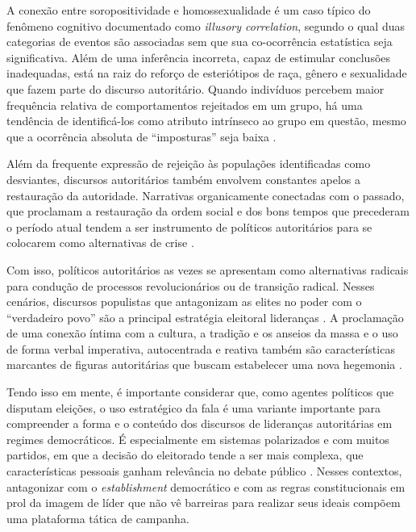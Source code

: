 \documentclass[
12pt,				%
openright,			%
twoside,			%
a4paper,			%
english,			%
french,				%
spanish,			%
brazil				%
]{abntex2}
\begin{document}
A conexão entre soropositividade e homossexualidade é um caso típico do fenômeno cognitivo documentado como \emph{illusory correlation}, segundo o qual duas categorias de eventos são associadas sem que sua co-ocorrência estatística seja significativa. Além de uma inferência incorreta, capaz de estimular conclusões inadequadas, está na raiz do reforço de esteriótipos de raça, gênero e sexualidade que fazem parte do discurso autoritário. Quando indivíduos percebem maior frequência relativa de comportamentos rejeitados em um grupo, há uma tendência de identificá-los como atributo intrínseco ao grupo em questão, mesmo que a ocorrência absoluta de ``imposturas'' seja baixa \cite{sidanius2001social}.   

Além da frequente expressão de rejeição às populações identificadas como desviantes, discursos autoritários também envolvem constantes apelos a restauração da autoridade. Narrativas organicamente conectadas com o passado, que proclamam a restauração da ordem social e dos bons tempos que precederam o período atual tendem a ser instrumento de políticos autoritários para se colocarem como alternativas de crise \cite{pinto2004indoctrinating, mietzner2014indonesia}. 

Com isso, políticos autoritários as vezes se apresentam como alternativas radicais para condução de processos revolucionários ou de transição radical. Nesses cenários, discursos populistas que antagonizam as elites no poder com o ``verdadeiro povo'' são a principal estratégia eleitoral lideranças \cite{muller2017populism, levitsky2018democracies}. A proclamação de uma conexão íntima com a cultura, a tradição e os anseios da massa e o uso de forma verbal imperativa, autocentrada e reativa também são características marcantes de figuras autoritárias que buscam estabelecer uma nova hegemonia \cite{goldschlager1982towards, gounari2018authoritarianism, hunter2019bolsonaro}.

Tendo isso em mente, é importante considerar que, como agentes políticos que disputam eleições, o uso estratégico da fala é uma variante importante para compreender a forma e o conteúdo dos discursos de lideranças autoritárias em regimes democráticos. É especialmente em sistemas polarizados e com muitos partidos, em que a decisão do eleitorado tende a ser mais complexa, que características pessoais ganham relevância no debate público \cite{adams2011candidates,curini2015conditional}. Nesses contextos, antagonizar com o \emph{establishment} democrático e com as regras constitucionais em prol da imagem de líder que não vê barreiras para realizar seus ideais compõem uma plataforma tática de campanha.   
\end{document}
